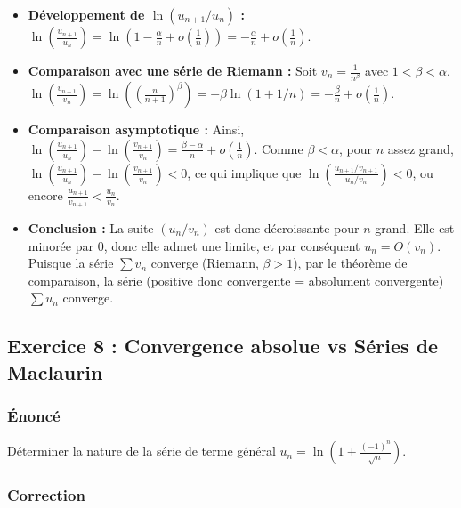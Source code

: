 \documentclass[12pt,a4paper]{report}
\begin{document}
\begin{itemize}
\item \textbf{Développement de $\ln(u_{n+1}/u_n)$ :}
   $\ln(\frac{u_{n+1}}{u_n}) = \ln(1 - \frac{\alpha}{n} + o(\frac{1}{n})) = -\frac{\alpha}{n} + o(\frac{1}{n})$.
\item \textbf{Comparaison avec une série de Riemann :}
   Soit $v_n = \frac{1}{n^\beta}$ avec $1 < \beta < \alpha$.
   $\ln(\frac{v_{n+1}}{v_n}) = \ln((\frac{n}{n+1})^\beta) = -\beta \ln(1 + 1/n) = -\frac{\beta}{n} + o(\frac{1}{n})$.
\item \textbf{Comparaison asymptotique :}
   Ainsi, $\ln(\frac{u_{n+1}}{u_n}) - \ln(\frac{v_{n+1}}{v_n}) = \frac{\beta - \alpha}{n} + o(\frac{1}{n})$.
   Comme $\beta < \alpha$, pour $n$ assez grand, $\ln(\frac{u_{n+1}}{u_n}) - \ln(\frac{v_{n+1}}{v_n}) < 0$, ce qui implique que $\ln(\frac{u_{n+1}/v_{n+1}}{u_n/v_n}) < 0$, ou encore $\frac{u_{n+1}}{v_{n+1}} < \frac{u_n}{v_n}$.
\item \textbf{Conclusion :}
   La suite $(u_n/v_n)$ est donc décroissante pour $n$ grand. Elle est minorée par 0, donc elle admet une limite, et par conséquent $u_n = O(v_n)$. Puisque la série $\sum v_n$ converge (Riemann, $\beta > 1$), par le théorème de comparaison, la série (positive donc convergente = absolument convergente) $\sum u_n$ converge.
\end{itemize}


\subsection{Exercice 8 : Convergence absolue vs Séries de Maclaurin}

\subsubsection{Énoncé}
Déterminer la nature de la série de terme général $u_n = \ln(1 + \frac{(-1)^n}{\sqrt{n}})$.

\subsubsection{Correction}
\end{document}
